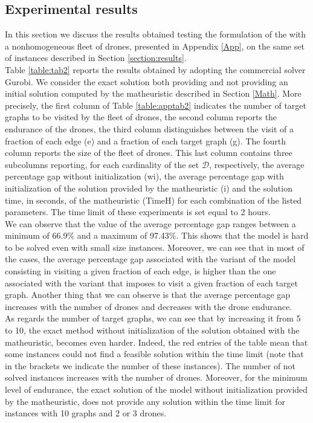 \subsection*{Experimental results}
\noindent
In this section we discuss the results obtained testing the formulation of the \AMD\xspace with a nonhomogeneous fleet of drones, presented in Appendix \ref{App}, on the same set of instances described in Section \ref{section:results}.\\
\noindent
Table \ref{table:tab2} reports the results obtained by adopting the commercial solver Gurobi. We consider the exact solution both providing and not providing an initial solution computed by the matheuristic described in Section \ref{Math}. More precisely, the first column of Table \ref{table:apptab2} indicates the number of target graphs to be visited by the fleet of drones, the second column reports the endurance of the drones, the third column distinguishes between the visit of a fraction of each edge (e) and a fraction of each target graph (g). The fourth column reports the size of the fleet of drones. This last column contains three subcolumns reporting, for each cardinality of the set $\mathcal D$, respectively, the average percentage gap without initialization (wi), the average percentage gap with initialization of the solution provided by the matheuristic (i) and the solution time, in seconds, of the matheuristic (TimeH) for each combination of the listed parameters. The time limit of these experiments is set equal to 2 hours.\\
We can observe that the value of the average percentage gap ranges between a minimum of 66.9\% and a maximum of 97.43\%. This shows that the model is hard to be solved even with small size instances. Moreover, we can see that in most of the cases, the average percentage gap associated with the variant of the model consisting in visiting a given fraction of each edge, is higher than the one associated with the variant that imposes to visit a given fraction of each target graph. Another thing that we can observe is that the average percentage gap increases with the number of drones and decreases with the drone endurance.\\
\noindent
As regards the number of target graphs, we can see that by increasing it from 5 to 10, the exact method without initialization of the solution obtained with the matheuristic, becomes even harder. Indeed, the red entries of the table mean that some instances could not find a feasible solution within the time limit (note that in the brackets we indicate the number of these instances). The number of not solved instances increases with the number of drones. Moreover, for the minimum level of endurance, the exact solution of the model without initialization provided by the matheuristic, does not provide any solution within the time limit for instances with 10 graphs and 2 or 3 drones.\\

